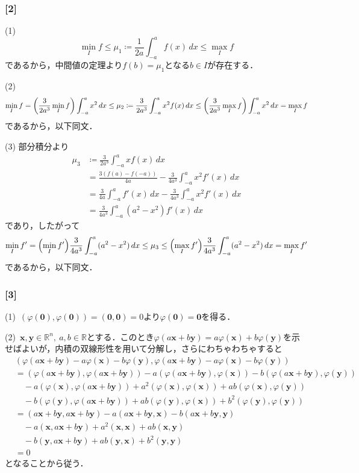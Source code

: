 \documentclass[a4j]{ltjsarticle}
\newcommand{\Rset}{\mathbb{R}}
\newcommand{\1}{\mathbbm{1}}
\numberwithin{equation}{section}
\theoremstyle{definition}
\begin{document}
\subsubsection*{[2]}
(1) 
\begin{equation}
    \min_{I}f\leq \mu_1\coloneq \frac{1}{2a}\int_{-a}^a f(x)\,dx \leq \max_{I}f
\end{equation}
であるから，中間値の定理より$f(b)=\mu_1$となる$b\in I$が存在する．

(2) 
\begin{equation}
    \min_I f=\qty(\frac{3}{2a^3}\min_I f)\int_{-a}^ax^2\,dx\leq \mu_2\coloneq \frac{3}{2a^3}\int_{-a}^a x^2f(x)\,dx\leq \qty(\frac{3}{2a^3}\max_I f)\int_{-a}^ax^2\,dx=\max_I f
\end{equation}
であるから，以下同文．

(3) 部分積分より
\begin{align}
    \mu_3&\coloneq \frac{3}{2a^3}\int_{-a}^a xf(x)\,dx\\
    &=\frac{3(f(a)-f(-a))}{4a}-\frac{3}{4a^3}\int_{-a}^ax^2f'(x)\,dx\\
    &=\frac{3}{4a}\int_{-a}^af'(x)\,dx -\frac{3}{4a^3}\int_{-a}^ax^2f'(x)\,dx\\
    &=\frac{3}{4a^3}\int_{-a}^a (a^2-x^2)f'(x)\,dx 
\end{align}
であり，したがって
\begin{equation}
    \min_{I}f'=\qty(\min_I f')\frac{3}{4a^3}\int_{-a}^a(a^2-x^2)\,dx\leq \mu_3\leq \qty(\max_I f')\frac{3}{4a^3}\int_{-a}^a(a^2-x^2)\,dx=\max_I f'
\end{equation}
であるから，以下同文．
\subsubsection*{[3]}
(1)\ $(\varphi(\bm{0}),\varphi(\bm{0}))=(\bm{0},\bm{0})=0$より$\varphi(\bm{0})=\bm{0}$を得る．

(2)\ $\bm{x},\bm{y}\in \Rset^n,\ a,b\in\Rset $とする．このとき$\varphi(a\bm{x}+b\bm{y})=a\varphi(\bm{x})+b\varphi(\bm{y})$を示せばよいが，内積の双線形性を用いて分解し，さらにわちゃわちゃすると
\begin{align}
    &(\varphi(a\bm{x}+b\bm{y})-a\varphi(\bm{x})-b\varphi(\bm{y}),\varphi(a\bm{x}+b\bm{y})-a\varphi(\bm{x})-b\varphi(\bm{y}))\\
    &=(\varphi(a\bm{x}+b\bm{y}),\varphi(a\bm{x}+b\bm{y}))-a(\varphi(a\bm{x}+b\bm{y}),\varphi(\bm{x}))-b(\varphi(a\bm{x}+b\bm{y}),\varphi(\bm{y}))\\
    &\quad -a(\varphi(\bm{x}),\varphi(a\bm{x}+b\bm{y}))+a^2(\varphi(\bm{x}),\varphi(\bm{x}))+ab(\varphi(\bm{x}),\varphi(\bm{y}))\\
    &\quad -b(\varphi(\bm{y}),\varphi(a\bm{x}+b\bm{y}))+ab(\varphi(\bm{y}),\varphi(\bm{x}))+b^2(\varphi(\bm{y}),\varphi(\bm{y}))\\
    &=(a\bm{x}+b\bm{y},a\bm{x}+b\bm{y})-a(a\bm{x}+b\bm{y},\bm{x})-b(a\bm{x}+b\bm{y},\bm{y})\\
    &\quad -a(\bm{x},a\bm{x}+b\bm{y})+a^2(\bm{x},\bm{x})+ab(\bm{x},\bm{y})\\
    &\quad -b(\bm{y},a\bm{x}+b\bm{y})+ab(\bm{y},\bm{x})+b^2(\bm{y},\bm{y})\\
    &=0
\end{align}
となることから従う．
\end{document}
